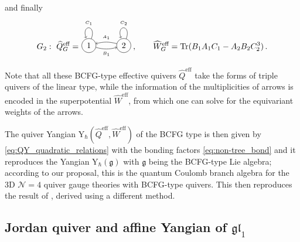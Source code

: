 \documentclass[12pt,a4paper]{article}
\renewcommand{\(}{\left(}
\renewcommand{\)}{\right)}
\renewcommand{\(}{\left(}
\renewcommand{\)}{\right)}
\begin{document}
and finally
{\small
\begin{equation}\label{eq:triple_G}
G_2:\ \widehat{Q}^{\text{eff}}_G=\begin{tikzpicture}[baseline={([yshift=-3ex]current bounding box.center)},vertex/.style={anchor=base,circle,fill=black!25,minimum size=18pt,inner sep=2pt}]
\node (v1) at (-3,0.2)[circle,draw] {1};
\node (v2) at (-1.5,0.2)[circle,draw] {2};

\draw[->] (v2) edge [bend right=15] node[above] {{\tiny $A_1$}} (v1);
\draw[->] (v1) edge [bend right=15] node[below] {{\tiny $B_1$}} (v2);
\draw (v1) edge [in=110,out=70,loop] node [above]{{\tiny $C_1$}} (v1);

\draw (v2) edge [in=110,out=70,loop] node [above]{{\tiny $C_2$}} (v2);
\end{tikzpicture}\,,\qquad
\widehat{W}_G^{\text{eff}}=\text{Tr}(B_{1}A_{1}C_{1}-A_{2}B_{2}C_2^3)\,.
\end{equation}
}

\noindent
Note that all these BCFG-type effective quivers $\widehat{Q}^{\text{eff}}$ take the forms of triple quivers of the linear type, while the information of the multiplicities of arrows is encoded in the superpotential $\widehat{W}^{\text{eff}}$, from which one can solve for the equivariant weights of the arrows.

The quiver Yangian Y$_{\hbar}(\widehat{Q}^{\text{eff}},\widehat{W}^{\text{eff}})$ of the BCFG type is then given by \eqref{eq:QY_quadratic_relations} with the bonding factors \eqref{eq:non-tree_bond} and it reproduces the Yangian Y$_{\hbar}(\mathfrak{g})$ with $\mathfrak{g}$ being the BCFG-type Lie algebra; according to our proposal, this is the quantum Coulomb branch algebra for the 3D $\mathcal{N}=4$ quiver gauge theories with BCFG-type quivers.
This then reproduces the result of \cite{Nakajima:2019olw}, derived using a different method.


\subsection{\texorpdfstring{Jordan quiver and affine Yangian of $\mathfrak{gl}_1$}{Jordan quiver and affine Yangian of gl1}}
\end{document}
